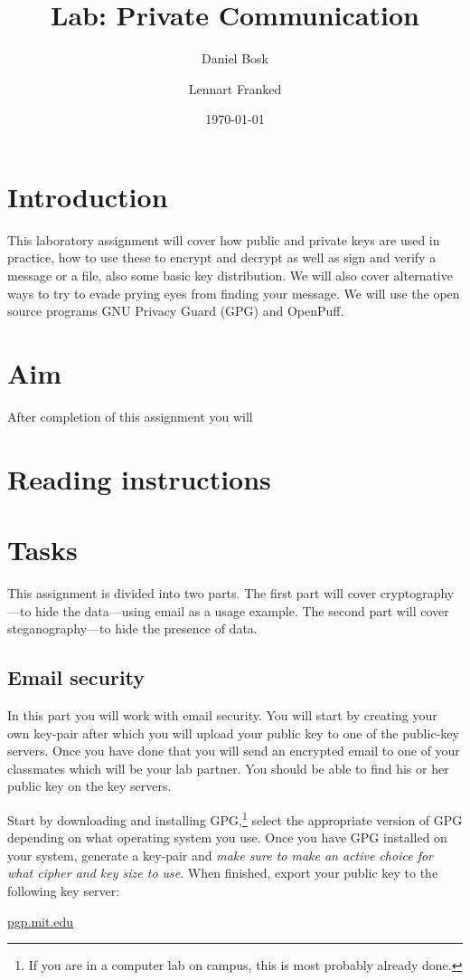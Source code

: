 \documentclass[a4paper]{llncs}
\title{Lab: Private Communication}
\author{%
  Daniel Bosk
  \and
  Lennart Franked
}
\institute{%
  Department of Information and Communication Systems\\
  Mid Sweden University, SE-851\,70 Sundsvall\\
}
\date{\today}
\begin{document}
\maketitle


\section{Introduction}
\label{Introduction}
This laboratory assignment will cover how public and private keys are used in 
practice, how to use these to encrypt and decrypt as well as sign and verify 
a message or a file, also some basic key distribution.
We will also cover alternative ways to try to evade prying eyes from finding
your message.
We will use the open source programs GNU Privacy Guard (GPG) and OpenPuff.


\section{Aim}
\label{sec:Aim}
After completion of this assignment you will
\begin{itemize}
    
\end{itemize}


\section{Reading instructions}
\label{sec:Reading}



\section{Tasks}
\label{sec:Tasks}
This assignment is divided into two parts.
The first part will cover cryptography---to hide the data---using email as 
a usage example.
The second part will cover steganography---to hide the presence of data.

\subsection{Email security}
\label{subsec:Email}
In this part you will work with email security.
You will start by creating your own key-pair after which you will upload your 
public key to one of the public-key servers.
Once you have done that you will send an encrypted email to one of your
classmates which will be your lab partner.
You should be able to find his or her public key on the key servers.

Start by downloading and installing GPG,\footnote{%
  If you are in a computer lab on campus, this is most probably already done.
} select the appropriate version of GPG depending on what operating system you 
use.
Once you have GPG installed on your system, generate a key-pair and \emph{make 
sure to make an active choice for what cipher and key size to use}.
When finished, export your public key to the following key server:
\begin{center}
  \url{pgp.mit.edu}
\end{center}
\end{document}
